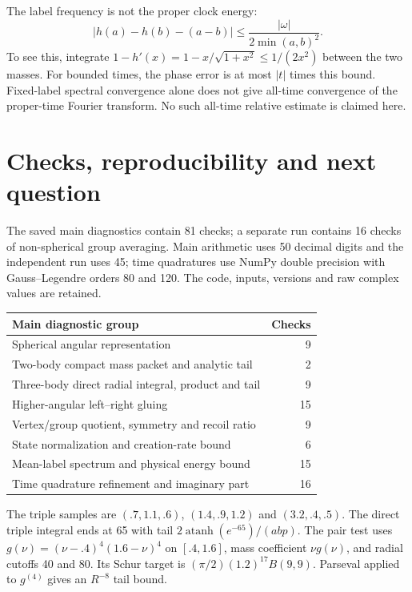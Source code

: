 \documentclass[11pt,a4paper]{article}
\begin{document}
The label frequency is not the proper clock energy:
\begin{equation}
 |h(a)-h(b)-(a-b)|\le\frac{|\omega|}{2\min(a,b)^2}.
\end{equation}
To see this, integrate $1-h'(x)=1-x/\sqrt{1+x^2}\le1/(2x^2)$
between the two masses. For bounded times, the phase error is at most
$|t|$ times this bound. Fixed-label spectral convergence alone does not
give all-time convergence of the proper-time Fourier transform.
No such all-time relative estimate is claimed here.

\newpage
\section{Checks, reproducibility and next question}
The saved main diagnostics contain 81 checks; a separate run contains
16 checks of non-spherical group averaging. Main arithmetic uses
50 decimal digits and the independent run uses 45; time quadratures use
NumPy double precision with Gauss--Legendre orders 80 and 120.
The code, inputs, versions and raw complex values are retained.

\begin{center}
\begin{tabular}{lr}
\toprule
Main diagnostic group & Checks\\ \midrule
Spherical angular representation &9\\
Two-body compact mass packet and analytic tail &2\\
Three-body direct radial integral, product and tail &9\\
Higher-angular left--right gluing &15\\
Vertex/group quotient, symmetry and recoil ratio &9\\
State normalization and creation-rate bound &6\\
Mean-label spectrum and physical energy bound &15\\
Time quadrature refinement and imaginary part &16\\ \bottomrule
\end{tabular}
\end{center}
The triple samples are $(.7,1.1,.6)$, $(1.4,.9,1.2)$ and $(3.2,.4,.5)$.
The direct triple integral ends at 65 with tail
$2\operatorname{atanh}(e^{-65})/(abp)$.
The pair test uses $g(\nu)=(\nu-.4)^4(1.6-\nu)^4$ on $[.4,1.6]$,
mass coefficient $\nu g(\nu)$, and radial cutoffs 40 and 80.
Its Schur target is $(\pi/2)(1.2)^{17}B(9,9)$.
Parseval applied to $g^{(4)}$ gives an $R^{-8}$ tail bound.
\end{document}
